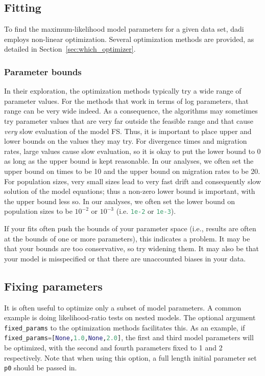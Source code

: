 \documentclass[12pt]{article}
\makeatletter
\newcommand{\dadi}{dadi\xspace}
\newcommand{\py}[1]{\lstinline[language=Python, showstringspaces=False]@#1@}
\makeatother
\begin{document}
\subsection{Fitting}

To find the maximum-likelihood model parameters for a given data set, \dadi employs non-linear optimization.
Several optimization methods are provided, as detailed in Section~\ref{sec:which_optimizer}.

\subsubsection{Parameter bounds}

In their exploration, the optimization methods typically try a wide range of parameter values.
For the methods that work in terms of log parameters, that range can be very wide indeed.
As a consequence, the algorithms may sometimes try parameter values that are very far outside the feasible range and that cause \emph{very} slow evaluation of the model FS.
Thus, it is important to place upper and lower bounds on the values they may try.
For divergence times and migration rates, large values cause slow evaluation, so it is okay to put the lower bound to 0 as long as the upper bound is kept reasonable.
In our analyses, we often set the upper bound on times to be 10 and the upper bound on migration rates to be 20.
For population sizes, very small sizes lead to very fast drift and consequently slow solution of the model equations; thus a non-zero lower bound is important, with the upper bound less so.
In our analyses, we often set the lower bound on population sizes to be $10^{-2}$ or $10^{-3}$ (i.e. \py{1e-2} or \py{1e-3}).

If your fits often push the bounds of your parameter space (i.e., results are often at the bounds of one or more parameters), this indicates a problem.
It may be that your bounds are too conservative, so try widening them.
It may also be that your model is misspecified or that there are unaccounted biases in your data.

\subsection{Fixing parameters}

It is often useful to optimize only a subset of model parameters.
A common example is doing likelihood-ratio tests on nested models.
The optional argument \py{fixed_params} to the optimization methods facilitates this.
As an example, if \py{fixed_params=[None,1.0,None,2.0]}, the first and third model parameters will be optimized, with the second and fourth parameters fixed to 1 and 2 respectively.
Note that when using this option, a full length initial parameter set \py{p0} should be passed in.
\end{document}
